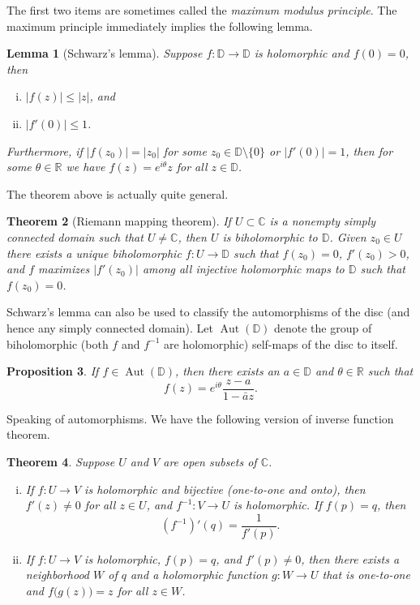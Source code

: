 \documentclass[12pt,openany]{book}
\newcommand{\Aut}{\operatorname{Aut}}
\newcommand{\sabs}[1]{\lvert {#1} \rvert}
\newcommand{\C}{{\mathbb{C}}}
\newcommand{\R}{{\mathbb{R}}}
\newcommand{\D}{{\mathbb{D}}}
\newcommand{\myindex}[1]{#1\index{#1}}
\theoremstyle{plain}
\newtheorem{thm}{Theorem}[section]
\newtheorem{lemma}[thm]{Lemma}
\newtheorem{prop}[thm]{Proposition}
\theoremstyle{remark}
\theoremstyle{definition}
\theoremstyle{exercise}
\theoremstyle{example}
\begin{document}
The first two items are sometimes called the \emph{\myindex{maximum modulus principle}}.
The maximum principle immediately implies the following lemma.

\begin{lemma}[Schwarz's lemma]
\pagebreak[2]
Suppose $f \colon \D \to \D$ is holomorphic and $f(0) = 0$, then
\begin{enumerate}[(i)]
\item $\sabs{f(z)} \leq \sabs{z}$, and
\item $\sabs{f'(0)} \leq 1$.
\end{enumerate}
Furthermore, if $\sabs{f(z_0)} = \sabs{z_0}$ for some $z_0 \in \D \setminus
\{ 0 \}$
or $\sabs{f'(0)} = 1$, then
for some $\theta \in \R$ we have $f(z) =
e^{i\theta} z$ for all $z \in \D$.
\end{lemma}

The theorem above is actually quite general.

\begin{thm}[Riemann mapping theorem]
If $U \subset \C$ is a nonempty simply connected domain such that $U \neq \C$,
then $U$ is biholomorphic to $\D$.  Given $z_0 \in U$
there exists a unique biholomorphic $f \colon U \to \D$
such that $f(z_0) = 0$, $f'(z_0) > 0$, and $f$
maximizes $\sabs{f'(z_0)}$ among all injective holomorphic maps to $\D$ such
that $f(z_0) = 0$.
\end{thm}

Schwarz's lemma can also be used to classify the automorphisms of the disc
(and hence any simply connected domain).  Let
$\Aut(\D)$ denote the group of biholomorphic (both $f$ and
$f^{-1}$ are holomorphic) self-maps of the
disc to itself.

\begin{prop}
If $f \in \Aut(\D)$, then there exists an $a \in \D$
and $\theta \in \R$ such that
\begin{equation*}
f(z) = e^{i\theta} \frac{z-a}{1-\bar{a}z} .
\end{equation*}
\end{prop}

Speaking of automorphisms.  We have the following
version of inverse function theorem.

\begin{thm}
Suppose $U$ and $V$ are open subsets of $\C$.
\begin{enumerate}[(i)]
\item
If $f \colon U \to V$ is holomorphic and bijective (one-to-one and onto),
then $f'(z) \neq 0$ for all $z \in U$, and $f^{-1} \colon V \to U$
is holomorphic.  If $f(p) = q$, then
\begin{equation*}
\left(f^{-1}\right)'(q) = \frac{1}{f'(p)} .
\end{equation*}
\item
If $f \colon U \to V$ is holomorphic, $f(p) = q$,
and $f'(p) \neq 0$, then there exists a neighborhood $W$ of $q$
and a holomorphic function $g \colon W \to U$ that is
one-to-one and $f\bigl(g(z)\bigr) = z$ for all $z \in W$.
\end{enumerate}
\end{thm}
\end{document}
